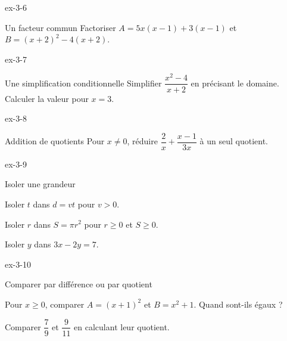\clearpage{}
\begin{blocLivre}{ex-3-6}
\begin{exercice}[2]{Un facteur commun}
Factoriser $A=5x(x-1)+3(x-1)$ et $B=(x+2)^2-4(x+2)$.
\end{exercice}
\end{blocLivre}
\begin{blocLivre}{ex-3-7}
\begin{exercice}[2]{Une simplification conditionnelle}
Simplifier $\dfrac{x^2-4}{x+2}$ en précisant le domaine. Calculer la valeur pour $x=3$.
\end{exercice}
\end{blocLivre}
\begin{blocLivre}{ex-3-8}
\begin{exercice}[2]{Addition de quotients}
Pour $x\ne0$, réduire $\dfrac{2}{x}+\dfrac{x-1}{3x}$ à un seul quotient.
\end{exercice}
\end{blocLivre}
\begin{blocLivre}{ex-3-9}
\begin{exercice}[2]{Isoler une grandeur}
\begin{questions}
\item Isoler $t$ dans $d=vt$ pour $v>0$.
\item Isoler $r$ dans $S=\pi r^2$ pour $r\ge0$ et $S\ge0$.
\item Isoler $y$ dans $3x-2y=7$.
\end{questions}
\end{exercice}
\end{blocLivre}
\begin{blocLivre}{ex-3-10}
\begin{exercice}[2]{Comparer par différence ou par quotient}
\begin{questions}
\item Pour $x\ge0$, comparer $A=(x+1)^2$ et $B=x^2+1$. Quand sont-ils égaux ?
\item Comparer $\dfrac79$ et $\dfrac9{11}$ en calculant leur quotient.
\end{questions}
\end{exercice}
\end{blocLivre}

